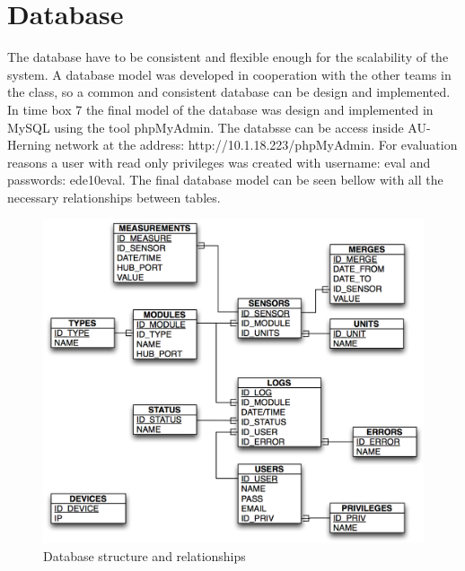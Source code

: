 \section{Database}
The database have to be consistent and flexible enough for the scalability of the system. A database model was developed in cooperation with the other teams in the class, so a common and consistent database can be design and implemented. 
\p
In time box 7 the final model of the database was design and implemented in MySQL using the tool phpMyAdmin. The databsse can be access inside AU-Herning network at the address: http://10.1.18.223/phpMyAdmin. For evaluation reasons a user with read only privileges was created with username: eval and passwords: ede10eval.
\p
The final database model can be seen bellow with all the necessary relationships between tables.
\begin{figure}[H]
	\begin{centering}
		\includegraphics[width=1.0\textwidth]{images/db_datamodel.png}
		\caption{Database structure and relationships}
	\end{centering}
\end{figure}
%
